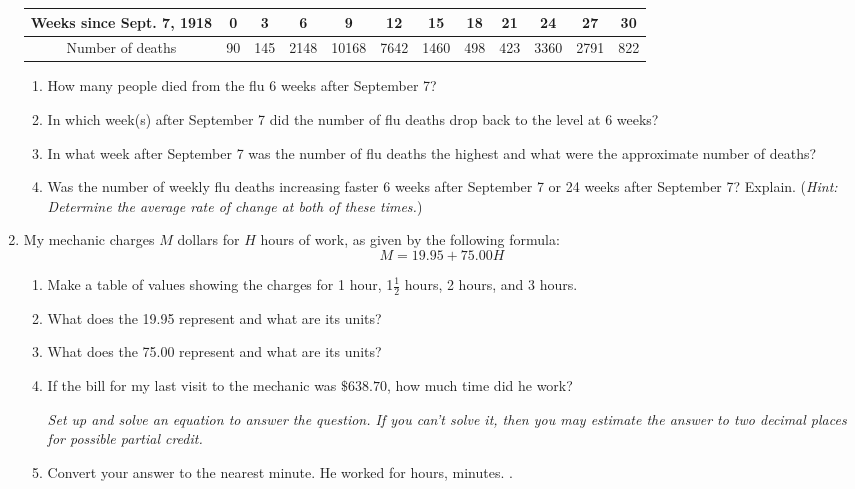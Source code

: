 \documentclass[12pt]{article}
\begin{document}
\begin{enumerate}
\begin{tabular} {|c|c|c|c|c |c|c|c|c|c |c|c|} \hline
Weeks since Sept. 7, 1918 & 0 & 3 & 6  & 9  & 12  & 15  & 18 & 21  & 24  & 27  & 30 \\ \hline
Number of deaths &90 & 145 & 2148 & 10168 & 7642 & 1460 & 498 & 423 & 3360 & 2791 & 822 \\ \hline
\end{tabular}

\begin{enumerate}
\item How many people died from the flu 6 weeks after September 7?
\vfill
\item In which week(s) after September 7 did the number of flu deaths drop back to the level at 6 weeks?
\vfill
\item In what week after September 7 was the number of flu deaths the highest and what were the approximate number of deaths?
\vfill
\item Was the number of weekly flu deaths increasing faster 6 weeks after September 7 or 24 weeks after September 7?  Explain. (\emph{Hint: Determine the average rate of change at both of these times.})
\vfill
\end{enumerate}

\newpage %

\item My mechanic charges $M$ dollars for $H$ hours of work, as given by the following formula:
$$M = 19.95 + 75.00H$$

\begin{enumerate}
\item Make a table of values showing the charges for 1 hour, 1$\frac{1}{2}$ hours, 2 hours, and 3 hours.
\vfill
\item What does the 19.95 represent and what are its units?
\vfill
\item What does the 75.00 represent and what are its units?
\vfill
\item If the bill for my last visit to the mechanic was $\$638.70$, how much time did he work?

\emph{Set up and solve an equation to answer the question.  If you can't solve it, then you may estimate the answer to two decimal places for possible partial credit.}
\vfill
\vfill
\vfill
\item Convert your answer to the nearest minute.
\vfill
He worked for \hrulefill hours, \hrulefill minutes. \hspace{3in}.
\end{enumerate}


\end{enumerate}
\end{document}
